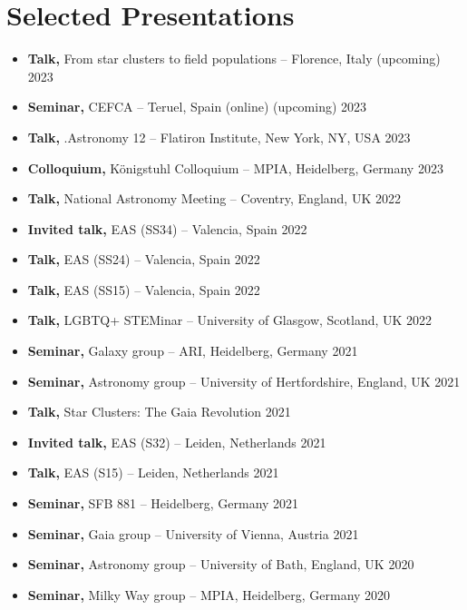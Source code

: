 \section*{Selected Presentations}

\begin{itemize}
    \item \textbf{Talk,} From star clusters to field populations -- Florence, Italy \hfill (upcoming) 2023
    \item \textbf{Seminar,} CEFCA -- Teruel, Spain (online) \hfill (upcoming) 2023
    \item \textbf{Talk,} .Astronomy 12 -- Flatiron Institute, New York, NY, USA \hfill 2023
    \item \textbf{Colloquium,} Königstuhl Colloquium -- MPIA, Heidelberg, Germany \hfill 2023
    \item \textbf{Talk,} National Astronomy Meeting -- Coventry, England, UK \hfill 2022
    \item \textbf{Invited talk,} EAS (SS34) -- Valencia, Spain \hfill 2022
    \item \textbf{Talk,} EAS (SS24) -- Valencia, Spain \hfill 2022
    \item \textbf{Talk,} EAS (SS15) -- Valencia, Spain \hfill 2022
    \item \textbf{Talk,} LGBTQ+ STEMinar  -- University of Glasgow, Scotland, UK \hfill 2022
    \item \textbf{Seminar,} Galaxy group -- ARI, Heidelberg, Germany \hfill 2021
    \item \textbf{Seminar,} Astronomy group -- University of Hertfordshire, England, UK \hfill 2021
    \item \textbf{Talk,} Star Clusters: The Gaia Revolution \hfill 2021
    \item \textbf{Invited talk,} EAS (S32) -- Leiden, Netherlands \hfill 2021
    \item \textbf{Talk,} EAS (S15) -- Leiden, Netherlands \hfill 2021
    \item \textbf{Seminar,} SFB 881 -- Heidelberg, Germany \hfill 2021
    \item \textbf{Seminar,} Gaia group -- University of Vienna, Austria \hfill 2021
    \item \textbf{Seminar,} Astronomy group -- University of Bath, England, UK \hfill 2020
    \item \textbf{Seminar,} Milky Way group -- MPIA, Heidelberg, Germany \hfill 2020
\end{itemize}